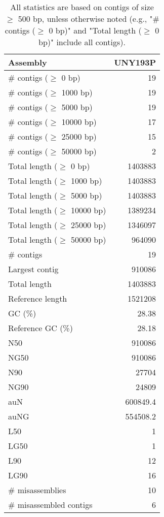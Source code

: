 \documentclass[12pt,a4paper]{article}
\begin{document}
\begin{table}[ht]
\begin{center}
\caption{All statistics are based on contigs of size $\geq$ 500 bp, unless otherwise noted (e.g., "\# contigs ($\geq$ 0 bp)" and "Total length ($\geq$ 0 bp)" include all contigs).}
\begin{tabular}{|l*{1}{|r}|}
\hline
Assembly & UNY193P \\ \hline
\# contigs ($\geq$ 0 bp) & 19 \\ \hline
\# contigs ($\geq$ 1000 bp) & 19 \\ \hline
\# contigs ($\geq$ 5000 bp) & 19 \\ \hline
\# contigs ($\geq$ 10000 bp) & 17 \\ \hline
\# contigs ($\geq$ 25000 bp) & 15 \\ \hline
\# contigs ($\geq$ 50000 bp) & 2 \\ \hline
Total length ($\geq$ 0 bp) & 1403883 \\ \hline
Total length ($\geq$ 1000 bp) & 1403883 \\ \hline
Total length ($\geq$ 5000 bp) & 1403883 \\ \hline
Total length ($\geq$ 10000 bp) & 1389234 \\ \hline
Total length ($\geq$ 25000 bp) & 1346097 \\ \hline
Total length ($\geq$ 50000 bp) & 964090 \\ \hline
\# contigs & 19 \\ \hline
Largest contig & 910086 \\ \hline
Total length & 1403883 \\ \hline
Reference length & 1521208 \\ \hline
GC (\%) & 28.38 \\ \hline
Reference GC (\%) & 28.18 \\ \hline
N50 & 910086 \\ \hline
NG50 & 910086 \\ \hline
N90 & 27704 \\ \hline
NG90 & 24809 \\ \hline
auN & 600849.4 \\ \hline
auNG & 554508.2 \\ \hline
L50 & 1 \\ \hline
LG50 & 1 \\ \hline
L90 & 12 \\ \hline
LG90 & 16 \\ \hline
\# misassemblies & 10 \\ \hline
\# misassembled contigs & 6 \\ \hline

\end{tabular}
\end{center}
\end{table}
\end{document}
